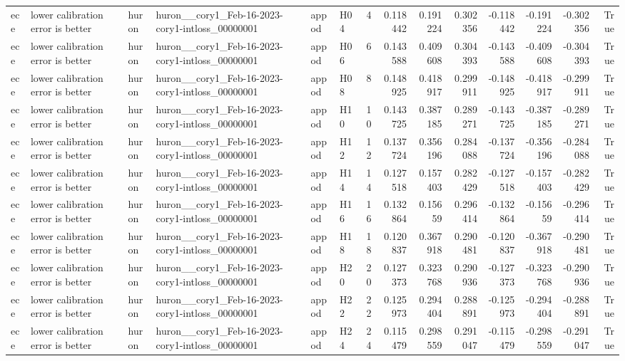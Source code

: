 \begin{longtable}{llllllrrrrrrrr}
ece & lower calibration error is better & huron & huron\_\_cory1\_Feb-16-2023-cory1-intloss\_00000001 & appod & H04 & 4 & 0.118442 & 0.191224 & 0.302356 & -0.118442 & -0.191224 & -0.302356 & True \\
ece & lower calibration error is better & huron & huron\_\_cory1\_Feb-16-2023-cory1-intloss\_00000001 & appod & H06 & 6 & 0.143588 & 0.409608 & 0.304393 & -0.143588 & -0.409608 & -0.304393 & True \\
ece & lower calibration error is better & huron & huron\_\_cory1\_Feb-16-2023-cory1-intloss\_00000001 & appod & H08 & 8 & 0.148925 & 0.418917 & 0.299911 & -0.148925 & -0.418917 & -0.299911 & True \\
ece & lower calibration error is better & huron & huron\_\_cory1\_Feb-16-2023-cory1-intloss\_00000001 & appod & H10 & 10 & 0.143725 & 0.387185 & 0.289271 & -0.143725 & -0.387185 & -0.289271 & True \\
ece & lower calibration error is better & huron & huron\_\_cory1\_Feb-16-2023-cory1-intloss\_00000001 & appod & H12 & 12 & 0.137724 & 0.356196 & 0.284088 & -0.137724 & -0.356196 & -0.284088 & True \\
ece & lower calibration error is better & huron & huron\_\_cory1\_Feb-16-2023-cory1-intloss\_00000001 & appod & H14 & 14 & 0.127518 & 0.157403 & 0.282429 & -0.127518 & -0.157403 & -0.282429 & True \\
ece & lower calibration error is better & huron & huron\_\_cory1\_Feb-16-2023-cory1-intloss\_00000001 & appod & H16 & 16 & 0.132864 & 0.15659 & 0.296414 & -0.132864 & -0.15659 & -0.296414 & True \\
ece & lower calibration error is better & huron & huron\_\_cory1\_Feb-16-2023-cory1-intloss\_00000001 & appod & H18 & 18 & 0.120837 & 0.367918 & 0.290481 & -0.120837 & -0.367918 & -0.290481 & True \\
ece & lower calibration error is better & huron & huron\_\_cory1\_Feb-16-2023-cory1-intloss\_00000001 & appod & H20 & 20 & 0.127373 & 0.323768 & 0.290936 & -0.127373 & -0.323768 & -0.290936 & True \\
ece & lower calibration error is better & huron & huron\_\_cory1\_Feb-16-2023-cory1-intloss\_00000001 & appod & H22 & 22 & 0.125973 & 0.294404 & 0.288891 & -0.125973 & -0.294404 & -0.288891 & True \\
ece & lower calibration error is better & huron & huron\_\_cory1\_Feb-16-2023-cory1-intloss\_00000001 & appod & H24 & 24 & 0.115479 & 0.298559 & 0.291047 & -0.115479 & -0.298559 & -0.291047 & True \\

\end{longtable}
